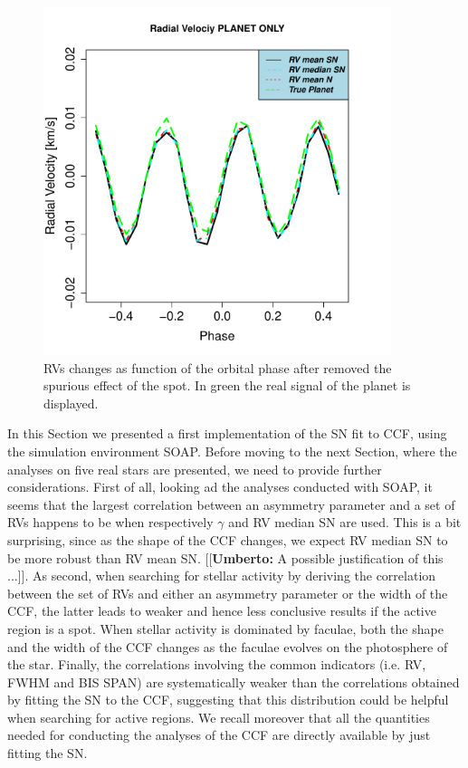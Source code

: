 \documentclass[11pt, oneside]{article}
\newcommand{\umberto}[1]{{\color{green}[[\textbf{Umberto: }#1]]}}
\begin{document}
\begin{figure}[htbp]
   \centering
\includegraphics[height = 4in]{RV_comparison_PLANET.pdf} 
   \caption{RVs changes as function of the orbital phase after removed the spurious effect of the spot. In green the real signal of the planet is displayed.}
    \label{fig:planet-spot}
\end{figure}

In this Section we presented a first implementation of the SN fit to CCF, using the simulation environment SOAP. Before moving to the next Section, where the analyses on five real stars are presented, we need to provide further considerations. First of all, looking ad the analyses conducted with SOAP, it seems that the largest correlation between an asymmetry parameter and a set of RVs happens to be when respectively $\gamma$ and RV median SN are used. This is a bit surprising, since as the shape of the CCF changes, we expect RV median SN to be more robust than RV mean SN. \umberto{A possible justification of this ...}. As second, when searching for stellar activity by deriving the correlation between the set of RVs and either an asymmetry parameter or the width of the CCF, the latter leads to weaker and hence less conclusive results if the active region is a spot. When stellar activity is dominated by faculae, both the shape and the width of the CCF changes as the faculae evolves on the photosphere of the star. Finally, the correlations involving the common indicators (i.e. RV, FWHM and BIS SPAN) are systematically weaker than the correlations obtained by fitting the SN to the CCF, suggesting that this distribution could be helpful when searching for active regions. We recall moreover that all the quantities needed for conducting the analyses of the CCF are directly available by just fitting the SN.
\end{document}
